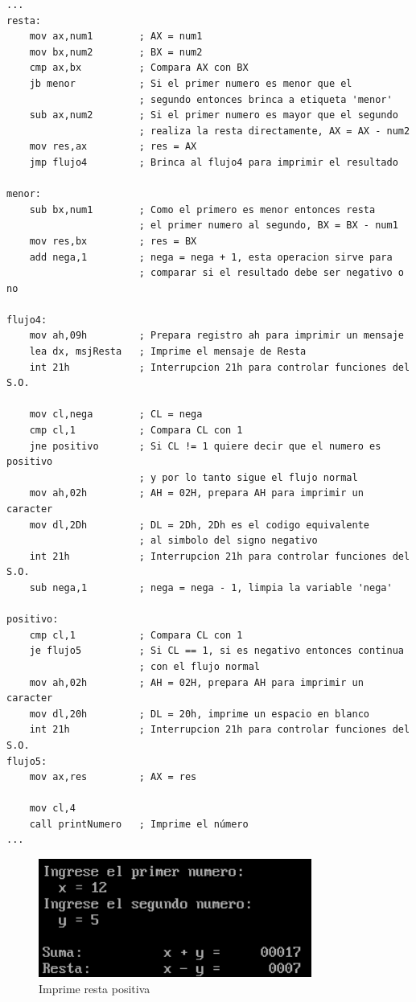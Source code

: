 \documentclass[letter,12 pt,titlepage]{article}
\begin{document}
\begin{verbatim}
...
resta:
    mov ax,num1        ; AX = num1
    mov bx,num2        ; BX = num2
    cmp ax,bx          ; Compara AX con BX
    jb menor           ; Si el primer numero es menor que el 
                       ; segundo entonces brinca a etiqueta 'menor'
    sub ax,num2        ; Si el primer numero es mayor que el segundo 
                       ; realiza la resta directamente, AX = AX - num2
    mov res,ax         ; res = AX
    jmp flujo4         ; Brinca al flujo4 para imprimir el resultado

menor:
    sub bx,num1        ; Como el primero es menor entonces resta 
                       ; el primer numero al segundo, BX = BX - num1
    mov res,bx         ; res = BX
    add nega,1         ; nega = nega + 1, esta operacion sirve para 
                       ; comparar si el resultado debe ser negativo o no

flujo4:
    mov ah,09h         ; Prepara registro ah para imprimir un mensaje
    lea dx, msjResta   ; Imprime el mensaje de Resta
    int 21h            ; Interrupcion 21h para controlar funciones del S.O.

    mov cl,nega        ; CL = nega
    cmp cl,1           ; Compara CL con 1
    jne positivo       ; Si CL != 1 quiere decir que el numero es positivo 
                       ; y por lo tanto sigue el flujo normal
    mov ah,02h         ; AH = 02H, prepara AH para imprimir un caracter
    mov dl,2Dh         ; DL = 2Dh, 2Dh es el codigo equivalente 
                       ; al simbolo del signo negativo
    int 21h            ; Interrupcion 21h para controlar funciones del S.O.
    sub nega,1         ; nega = nega - 1, limpia la variable 'nega'

positivo:
    cmp cl,1           ; Compara CL con 1
    je flujo5          ; Si CL == 1, si es negativo entonces continua 
                       ; con el flujo normal
    mov ah,02h         ; AH = 02H, prepara AH para imprimir un caracter
    mov dl,20h         ; DL = 20h, imprime un espacio en blanco
    int 21h            ; Interrupcion 21h para controlar funciones del S.O.
flujo5:
    mov ax,res         ; AX = res

    mov cl,4
    call printNumero   ; Imprime el número 
...
\end{verbatim}

    \begin{figure}[H]
    \centering
    \includegraphics[width=0.8\textwidth]{img/03.png}
    \caption{Imprime resta positiva}
    \end{figure}
\end{document}
